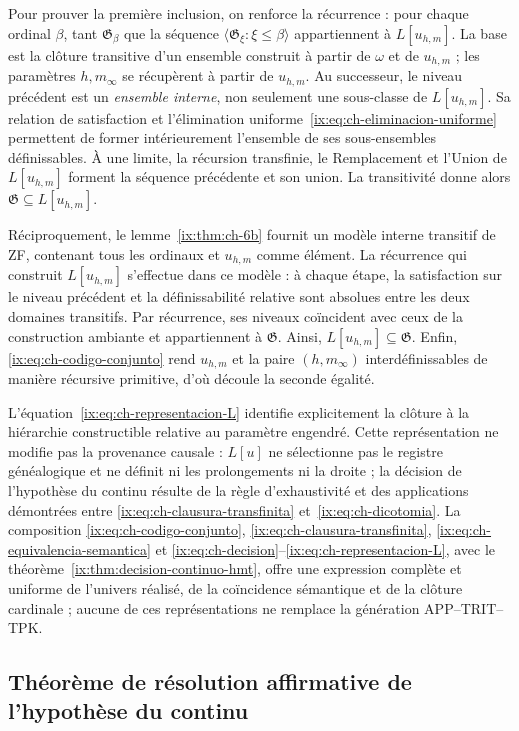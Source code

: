Pour prouver la première inclusion, on renforce la récurrence : pour chaque
ordinal \(\beta\), tant \(\mathfrak G_\beta\) que la séquence
\(\langle\mathfrak G_\xi:\xi\leq\beta\rangle\) appartiennent à
\(L[u_{h,m}]\). La base est la clôture transitive d’un ensemble construit
à partir de \(\omega\) et de \(u_{h,m}\) ; les paramètres \(h,m_\infty\) se récupèrent
à partir de \(u_{h,m}\). Au successeur, le niveau précédent est un \emph{ensemble
interne}, non seulement une sous-classe de \(L[u_{h,m}]\). Sa relation de satisfaction
et l’élimination uniforme~\eqref{ix:eq:ch-eliminacion-uniforme} permettent de former intérieurement l’ensemble de
ses sous-ensembles définissables. À une limite, la récursion transfinie,
le Remplacement et l’Union de \(L[u_{h,m}]\) forment la séquence précédente et son union.
La transitivité donne alors \(\mathfrak G\subseteq L[u_{h,m}]\).

Réciproquement, le lemme~\ref{ix:thm:ch-6b} fournit un modèle interne
transitif de ZF, contenant tous les ordinaux et \(u_{h,m}\) comme élément.
La récurrence qui construit \(L[u_{h,m}]\) s’effectue dans ce modèle : à chaque
étape, la satisfaction sur le niveau précédent et la définissabilité relative sont
absolues entre les deux domaines transitifs. Par récurrence, ses niveaux
coïncident avec ceux de la construction ambiante et appartiennent à
\(\mathfrak G\). Ainsi, \(L[u_{h,m}]\subseteq\mathfrak G\). Enfin,
\eqref{ix:eq:ch-codigo-conjunto} rend \(u_{h,m}\) et la paire \((h,m_\infty)\)
interdéfinissables de manière récursive primitive, d’où découle la seconde
égalité.

L'équation~\eqref{ix:eq:ch-representacion-L} identifie explicitement la clôture à la hiérarchie constructible relative au paramètre engendré. Cette représentation ne modifie pas la provenance causale : \(L[u]\) ne sélectionne pas le registre généalogique et ne définit ni les prolongements ni la droite ; la décision de l'hypothèse du continu résulte de la règle d'exhaustivité et des applications démontrées entre \eqref{ix:eq:ch-clausura-transfinita} et~\eqref{ix:eq:ch-dicotomia}. La composition \eqref{ix:eq:ch-codigo-conjunto}, \eqref{ix:eq:ch-clausura-transfinita}, \eqref{ix:eq:ch-equivalencia-semantica} et \eqref{ix:eq:ch-decision}--\eqref{ix:eq:ch-representacion-L}, avec le théorème~\ref{ix:thm:decision-continuo-hmt}, offre une expression complète et uniforme de l'univers réalisé, de la coïncidence sémantique et de la clôture cardinale ; aucune de ces représentations ne remplace la génération APP--TRIT--TPK.

\subsection{Théorème de résolution affirmative de l’hypothèse du continu}

